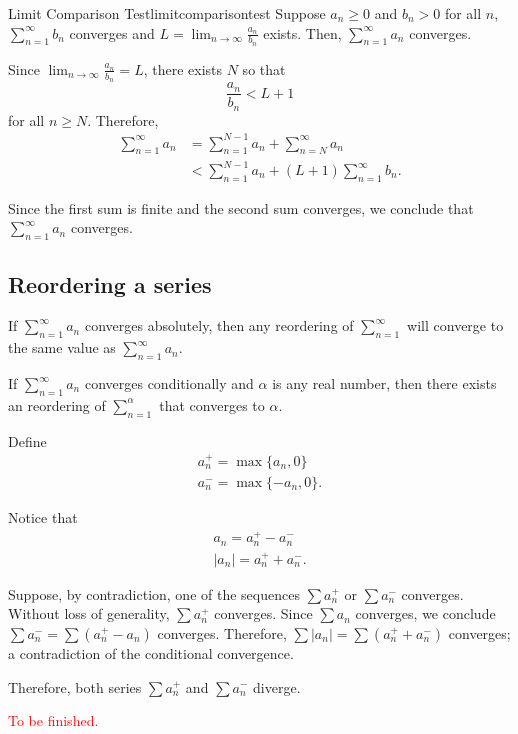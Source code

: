 
\begin{thm}{Limit Comparison Test}{limitcomparisontest}
	Suppose \(a_n \geq 0\) and \(b_n > 0\) for all \(n\), \(\sum_{n=1}^\infty b_n\) converges and \(L = \lim_{n\to\infty} \frac{a_n}{b_n}\) exists. Then, \(\sum_{n=1}^\infty a_n\) converges.
\end{thm}

\begin{dem}{}{}
	Since \(\lim_{n\to\infty} \frac{a_n}{b_n} = L\), there exists \(N\) so that \[
		\frac{a_n}{b_n} < L + 1
	\] for all \(n \geq N\).
	Therefore,
	\begin{align*}
		\sum_{n=1}^\infty a_n &= \sum_{n=1}^{N-1}a_n + \sum_{n=N}^\infty a_n \\
		&< \sum_{n=1}^{N-1}a_n + (L+1) \sum_{n=1}^\infty b_n.
	\end{align*}

	Since the first sum is finite and the second sum converges, we conclude that \(\sum_{n=1}^\infty a_n\) converges.
\end{dem}

\subsection{Reordering a series}

\begin{thm}{}{}
	If \(\sum_{n=1}^\infty a_n\) converges absolutely, then any reordering of \(\sum_{n=1}^\infty\) will converge to the same value as \(\sum_{n=1}^\infty a_n\).
\end{thm}

\begin{thm}{}{}
	If \(\sum_{n=1}^\infty a_n\) converges conditionally and \(\alpha\) is any real number, then there exists an reordering of \(\sum_{n=1}^\alpha\) that converges to \(\alpha\).
\end{thm}

\begin{dem}{}{}
	Define \begin{gather*}
		a_n^+ = \max\{a_n, 0\} \\
		a_n^- = \max\{-a_n, 0\}.
	\end{gather*}

	Notice that \begin{gather*}
		a_n = a_n^+ - a_n^- \\
		|a_n| = a_n^+ + a_n^-.
	\end{gather*}

	Suppose, by contradiction, one of the sequences \(\sum a_n^+\) or  \(\sum a_n^-\) converges. Without loss of generality, \(\sum a_n^+\) converges. Since \(\sum a_n\) converges, we conclude \(\sum a_n^- = \sum (a_n^+ - a_n) \) converges. Therefore, \(\sum |a_n| = \sum (a_n^+ + a_n^-)\) converges; a contradiction of the conditional convergence.

	Therefore, both series \(\sum a_n^+\) and \(\sum a_n^-\) diverge.

	\textcolor{red}{To be finished.}
\end{dem}
